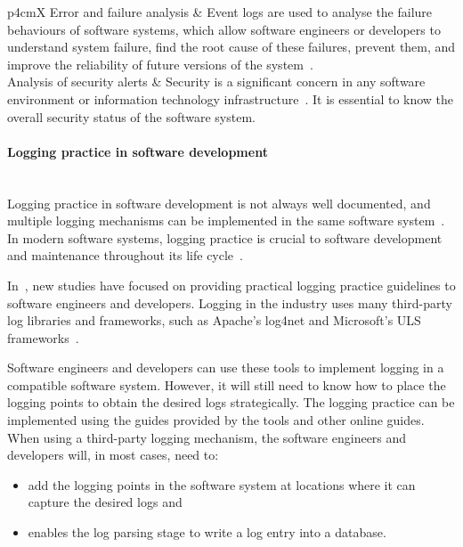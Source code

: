 \begin{xltabular}{\textwidth}{p{4cm}X}
	Error and failure analysis & \RaggedRight Event logs are used to analyse the failure behaviours of software systems, which allow software engineers or developers to understand system failure, find the root cause of these failures, prevent them, and improve the reliability of future versions of the system~\cite{Cinque2013}.\\


	\RaggedRight Analysis of security alerts & \RaggedRight Security is a significant concern in any software environment or information technology infrastructure~\cite{Pathan2014, Dwyer2013}. It is essential to know the overall security status of the software system. \\
	\bottomrule
\end{xltabular}

\paragraph{Logging practice in software development}\label{sec:ch1_loggingPractice}\leavevmode\\
Logging practice in software development is not always well documented, and multiple logging mechanisms can be implemented in the same software system~\cite{Pecchia2015, Kitchenham2007}. In modern software systems, logging practice is crucial to software development and maintenance throughout its life cycle~\cite{Rong2018}.\par In~, new studies have focused on providing practical logging practice guidelines to software engineers and developers. Logging in the industry uses many third-party log libraries and frameworks, such as Apache's log4net and Microsoft's ULS frameworks~\cite{Zhu2015, Rong2018}.\par Software engineers and developers can use these tools to implement logging in a compatible software system. However, it will still need to know how to place the logging points to obtain the desired logs strategically. The logging practice can be implemented using the guides provided by the tools and other online guides. When using a third-party logging mechanism, the software engineers and developers will, in most cases, need to:

\begin{itemize}
	\item add the logging points in the software system at locations where it can capture the desired logs and
	\item enables the log parsing stage to write a log entry into a database.
\end{itemize}

